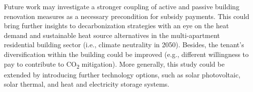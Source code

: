 Future work may investigate a stronger coupling of active and passive building renovation measures as a necessary precondition for subsidy payments. This could bring further insights to decarbonization strategies with an eye on the heat demand and sustainable heat source alternatives in the multi-apartment residential building sector (i.e., climate neutrality in 2050). Besides, the tenant's diversification within the building could be improved (e.g., different willingness to pay to contribute to CO\textsubscript{2} mitigation). More generally, this study could be extended by introducing further technology options, such as solar photovoltaic, solar thermal, and heat and electricity storage systems. 